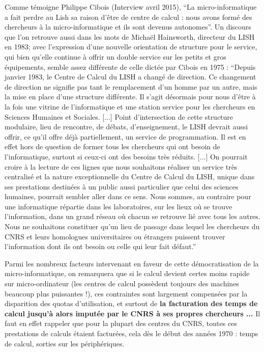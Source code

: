 Comme témoigne Philippe Cibois (Interview avril 2015), \enquote{La micro-informatique a fait perdre au Lish sa raison d'être de centre de calcul : nous avons formé des chercheurs à la micro-informatique et ils sont devenus autonomes}. Un discours que l’on retrouve aussi dans les mots de Michaël Hainsworth, directeur du LISH en 1983; avec l’expression d’une nouvelle orientation de structure pour le service, qui bien qu’elle continue à offrir un double service sur les petits et gros équipements, semble assez différente de celle dictée par Cibois en 1975 : \enquote{Depuis janvier 1983, le Centre de Calcul du LISH a changé de direction. Ce changement de direction ne signifie pas tant le remplacement d'un homme par un autre, mais la mise en place d'une structure différente. Il s'agit désormais pour nous d'être à la fois une vitrine de l'informatique et une station service pour les chercheurs en Sciences Humaines et Sociales. [...] Point d'intersection de cette structure modulaire, lieu de rencontre, de débats, d'enseignement, le LISH devrait aussi offrir, ce qu'il offre déjà partiellement, un service de programmation. Il est en effet hors de question de former tous les chercheurs qui ont besoin de l'informatique, surtout si ceux-ci ont des besoins très réduits. [...] On pourrait croire à la lecture de ces lignes que nous souhaitons réaliser un service très centralisé et la nature exceptionnelle du Centre de Calcul du LISH, unique dans ses prestations destinées à un public aussi particulier que celui des sciences humaines, pourrait sembler aller dans ce sens. Nous sommes, au contraire pour une informatique répartie dans les laboratoires, sur les lieux où se trouve l'information, dans un grand réseau où chacun se retrouve lié avec tous les autres. Nous ne souhaitons constituer qu'un lieu de passage dans lequel les chercheurs du CNRS et leurs homologues universitaires ou étrangers puissent trouver l'information dont ils ont besoin ou celle qui leur fait défaut.}

Parmi les nombreux facteurs intervenant en faveur de cette démocratisation de la micro-informatique, on remarquera que si le calcul devient certes moins rapide sur micro-ordinateur (les centres de calcul possèdent toujours des machines beaucoup plus puissantes !), ces contraintes sont largement compensées par la disparition des quotas d'utilisation, et surtout de \textbf{la facturation des temps de calcul jusqu’à alors imputée par le CNRS à ses propres chercheurs ...} Il faut en effet rappeler que pour la plupart des centres du CNRS, toutes ces prestations de calculs étaient facturées, cela dès le début des années 1970 : temps de calcul, sorties sur les périphériques.

